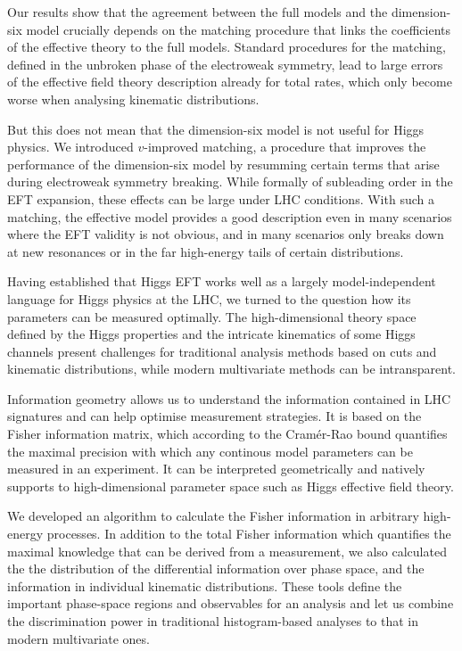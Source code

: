 Our results show that the agreement between the full models and the
dimension-six model crucially depends on the matching procedure that
links the coefficients of the effective theory to the full
models. Standard procedures for the matching, defined in the unbroken
phase of the electroweak symmetry, lead to large errors of the
effective field theory description already for total rates, which only
become worse when analysing kinematic distributions.

But this does not mean that the dimension-six model is not useful for
Higgs physics. We introduced $v$-improved matching, a procedure that
improves the performance of the dimension-six model by resumming
certain terms that arise during electroweak symmetry breaking. While
formally of subleading order in the EFT expansion, these effects can
be large under LHC conditions. With such a matching, the effective
model provides a good description even in many scenarios where the EFT
validity is not obvious, and in many scenarios only breaks down at new
resonances or in the far high-energy tails of certain distributions.

\newparagraph
%
Having established that Higgs EFT works well as a largely
model-independent language for Higgs physics at the LHC, we turned to
the question how its parameters can be measured optimally. The
high-dimensional theory space defined by the Higgs properties and the
intricate kinematics of some Higgs channels present challenges for
traditional analysis methods based on cuts and kinematic
distributions, while modern multivariate methods can be intransparent.

Information geometry allows us to understand the information contained
in LHC signatures and can help optimise measurement strategies. It is
based on the Fisher information matrix, which according to the
Cram\'er-Rao bound quantifies the maximal precision with which any
continous model parameters can be measured in an experiment. It can be
interpreted geometrically and natively supports to high-dimensional
parameter space such as Higgs effective field theory.

We developed an algorithm to calculate the Fisher information in
arbitrary high-energy processes. In addition to the total Fisher
information which quantifies the maximal knowledge that can be derived
from a measurement, we also calculated the the distribution of the
differential information over phase space, and the information in
individual kinematic distributions. These tools define the important
phase-space regions and observables for an analysis and let us combine
the discrimination power in traditional histogram-based analyses to
that in modern multivariate ones.


